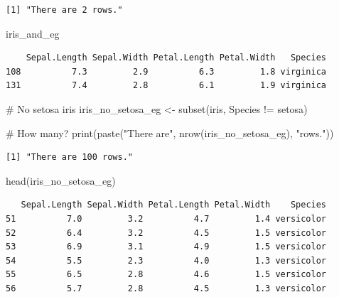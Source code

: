 \documentclass[
  letterpaper,
]{book}
\newenvironment{Shaded}{\begin{snugshade}}{\end{snugshade}}
\newcommand{\CommentTok}[1]{\textcolor[rgb]{0.37,0.37,0.37}{#1}}
\newcommand{\FunctionTok}[1]{\textcolor[rgb]{0.28,0.35,0.67}{#1}}
\newcommand{\NormalTok}[1]{\textcolor[rgb]{0.00,0.23,0.31}{#1}}
\newcommand{\OtherTok}[1]{\textcolor[rgb]{0.00,0.23,0.31}{#1}}
\newcommand{\SpecialCharTok}[1]{\textcolor[rgb]{0.37,0.37,0.37}{#1}}
\newcommand{\StringTok}[1]{\textcolor[rgb]{0.13,0.47,0.30}{#1}}
\begin{document}
\begin{verbatim}
[1] "There are 2 rows."
\end{verbatim}

\begin{Shaded}
\begin{Highlighting}[]
\NormalTok{iris\_and\_eg}
\end{Highlighting}
\end{Shaded}

\begin{verbatim}
    Sepal.Length Sepal.Width Petal.Length Petal.Width   Species
108          7.3         2.9          6.3         1.8 virginica
131          7.4         2.8          6.1         1.9 virginica
\end{verbatim}

\begin{Shaded}
\begin{Highlighting}[]
\CommentTok{\# No setosa iris}
\NormalTok{iris\_no\_setosa\_eg }\OtherTok{\textless{}{-}} \FunctionTok{subset}\NormalTok{(iris, Species }\SpecialCharTok{!=} \StringTok{\textquotesingle{}setosa\textquotesingle{}}\NormalTok{)}

\CommentTok{\# How many?}
\FunctionTok{print}\NormalTok{(}\FunctionTok{paste}\NormalTok{(}\StringTok{"There are"}\NormalTok{, }\FunctionTok{nrow}\NormalTok{(iris\_no\_setosa\_eg), }\StringTok{"rows."}\NormalTok{))}
\end{Highlighting}
\end{Shaded}

\begin{verbatim}
[1] "There are 100 rows."
\end{verbatim}

\begin{Shaded}
\begin{Highlighting}[]
\FunctionTok{head}\NormalTok{(iris\_no\_setosa\_eg)}
\end{Highlighting}
\end{Shaded}

\begin{verbatim}
   Sepal.Length Sepal.Width Petal.Length Petal.Width    Species
51          7.0         3.2          4.7         1.4 versicolor
52          6.4         3.2          4.5         1.5 versicolor
53          6.9         3.1          4.9         1.5 versicolor
54          5.5         2.3          4.0         1.3 versicolor
55          6.5         2.8          4.6         1.5 versicolor
56          5.7         2.8          4.5         1.3 versicolor
\end{verbatim}
\end{document}
